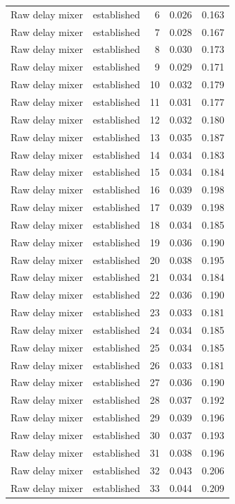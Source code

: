 \begin{tabular}{llrrr}
Raw delay mixer & established & 6 & 0.026 & 0.163 \\
Raw delay mixer & established & 7 & 0.028 & 0.167 \\
Raw delay mixer & established & 8 & 0.030 & 0.173 \\
Raw delay mixer & established & 9 & 0.029 & 0.171 \\
Raw delay mixer & established & 10 & 0.032 & 0.179 \\
Raw delay mixer & established & 11 & 0.031 & 0.177 \\
Raw delay mixer & established & 12 & 0.032 & 0.180 \\
Raw delay mixer & established & 13 & 0.035 & 0.187 \\
Raw delay mixer & established & 14 & 0.034 & 0.183 \\
Raw delay mixer & established & 15 & 0.034 & 0.184 \\
Raw delay mixer & established & 16 & 0.039 & 0.198 \\
Raw delay mixer & established & 17 & 0.039 & 0.198 \\
Raw delay mixer & established & 18 & 0.034 & 0.185 \\
Raw delay mixer & established & 19 & 0.036 & 0.190 \\
Raw delay mixer & established & 20 & 0.038 & 0.195 \\
Raw delay mixer & established & 21 & 0.034 & 0.184 \\
Raw delay mixer & established & 22 & 0.036 & 0.190 \\
Raw delay mixer & established & 23 & 0.033 & 0.181 \\
Raw delay mixer & established & 24 & 0.034 & 0.185 \\
Raw delay mixer & established & 25 & 0.034 & 0.185 \\
Raw delay mixer & established & 26 & 0.033 & 0.181 \\
Raw delay mixer & established & 27 & 0.036 & 0.190 \\
Raw delay mixer & established & 28 & 0.037 & 0.192 \\
Raw delay mixer & established & 29 & 0.039 & 0.196 \\
Raw delay mixer & established & 30 & 0.037 & 0.193 \\
Raw delay mixer & established & 31 & 0.038 & 0.196 \\
Raw delay mixer & established & 32 & 0.043 & 0.206 \\
Raw delay mixer & established & 33 & 0.044 & 0.209 \\

\end{tabular}
